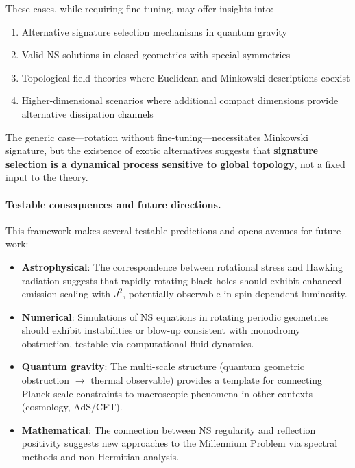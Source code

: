 \documentclass[11pt]{article}
\begin{document}
These cases, while requiring fine-tuning, may offer insights into:
\begin{enumerate}
\item Alternative signature selection mechanisms in quantum gravity
\item Valid NS solutions in closed geometries with special symmetries  
\item Topological field theories where Euclidean and Minkowski descriptions coexist
\item Higher-dimensional scenarios where additional compact dimensions provide 
alternative dissipation channels
\end{enumerate}

The generic case---rotation without fine-tuning---necessitates Minkowski signature, 
but the existence of exotic alternatives suggests that \textbf{signature selection 
is a dynamical process sensitive to global topology}, not a fixed input to the theory.

\paragraph{Testable consequences and future directions.}
This framework makes several testable predictions and opens avenues for future work:

\begin{itemize}
\item \textbf{Astrophysical}: The correspondence between rotational stress and 
Hawking radiation suggests that rapidly rotating black holes should exhibit enhanced 
emission scaling with $J^2$, potentially observable in spin-dependent luminosity.

\item \textbf{Numerical}: Simulations of NS equations in rotating periodic geometries 
should exhibit instabilities or blow-up consistent with monodromy obstruction, 
testable via computational fluid dynamics.

\item \textbf{Quantum gravity}: The multi-scale structure (quantum geometric 
obstruction $\to$ thermal observable) provides a template for connecting Planck-scale 
constraints to macroscopic phenomena in other contexts (cosmology, AdS/CFT).

\item \textbf{Mathematical}: The connection between NS regularity and reflection 
positivity suggests new approaches to the Millennium Problem via spectral methods 
and non-Hermitian analysis.
\end{itemize}
\end{document}
